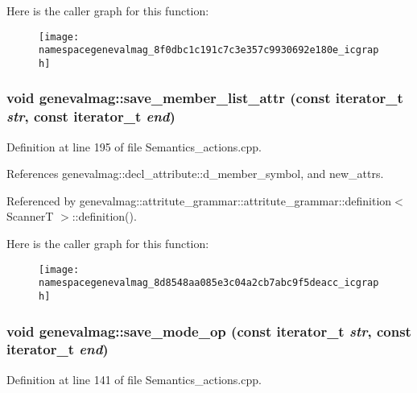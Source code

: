 Here is the caller graph for this function:\nopagebreak
\begin{figure}[H]
\begin{center}
\leavevmode
\texttt{[image: namespacegenevalmag\_8f0dbc1c191c7c3e357c9930692e180e\_icgraph]}
\end{center}
\end{figure}
\hypertarget{namespacegenevalmag_8d8548aa085e3c04a2cb7abc9f5deacc}{
\subsubsection[{save\_\-member\_\-list\_\-attr}]{\setlength{\rightskip}{0pt plus 5cm}void genevalmag::save\_\-member\_\-list\_\-attr (const iterator\_\-t {\em str}, \/  const iterator\_\-t {\em end})}}
\label{namespacegenevalmag_8d8548aa085e3c04a2cb7abc9f5deacc}




Definition at line 195 of file Semantics\_\-actions.cpp.

References genevalmag::decl\_\-attribute::d\_\-member\_\-symbol, and new\_\-attrs.

Referenced by genevalmag::attritute\_\-grammar::attritute\_\-grammar::definition$<$ ScannerT $>$::definition().

Here is the caller graph for this function:\nopagebreak
\begin{figure}[H]
\begin{center}
\leavevmode
\texttt{[image: namespacegenevalmag\_8d8548aa085e3c04a2cb7abc9f5deacc\_icgraph]}
\end{center}
\end{figure}
\hypertarget{namespacegenevalmag_6c04408088fac02746a5a14e9b10f304}{
\subsubsection[{save\_\-mode\_\-op}]{\setlength{\rightskip}{0pt plus 5cm}void genevalmag::save\_\-mode\_\-op (const iterator\_\-t {\em str}, \/  const iterator\_\-t {\em end})}}
\label{namespacegenevalmag_6c04408088fac02746a5a14e9b10f304}




Definition at line 141 of file Semantics\_\-actions.cpp.

